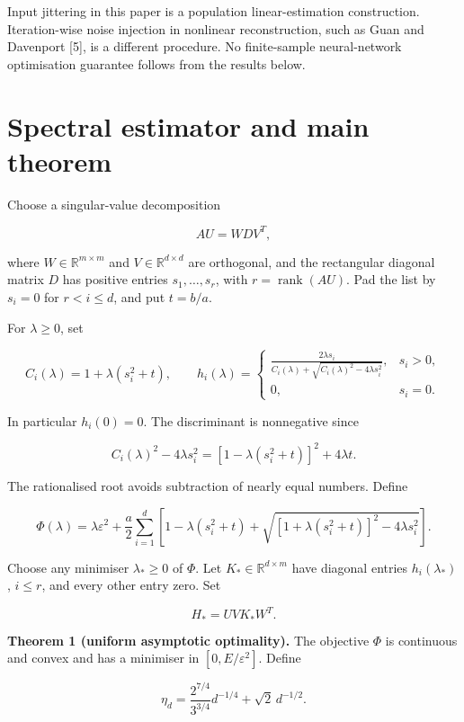 \documentclass[11pt,a4paper]{article}
\begin{document}
Input jittering in this paper is a population linear-estimation
construction. Iteration-wise noise injection in nonlinear
reconstruction, such as Guan and Davenport {[}5{]}, is a different
procedure. No finite-sample neural-network optimisation guarantee
follows from the results below.

\hypertarget{spectral-estimator-and-main-theorem}{%
\section{Spectral estimator and main
theorem}\label{spectral-estimator-and-main-theorem}}

Choose a singular-value decomposition

\[
AU=WDV^T,
\]

where \(W\in\mathbb R^{m\times m}\) and \(V\in\mathbb R^{d\times d}\)
are orthogonal, and the rectangular diagonal matrix \(D\) has positive
entries \(s_1,\ldots,s_r\), with \(r=\operatorname{rank}(AU)\). Pad the
list by \(s_i=0\) for \(r<i\le d\), and put \(t=b/a\).

For \(\lambda\ge0\), set

\[
C_i(\lambda)=1+\lambda(s_i^2+t),\qquad
h_i(\lambda)=
\begin{cases}
\displaystyle
\frac{2\lambda s_i}
{C_i(\lambda)+\sqrt{C_i(\lambda)^2-4\lambda s_i^2}},
&s_i>0,\\[8pt]
0,&s_i=0.
\end{cases}
\tag{3}
\]

In particular \(h_i(0)=0\). The discriminant is nonnegative since

\[
C_i(\lambda)^2-4\lambda s_i^2
=[1-\lambda(s_i^2+t)]^2+4\lambda t.
\]

The rationalised root avoids subtraction of nearly equal numbers. Define

\[
\Phi(\lambda)=\lambda\varepsilon^2+
\frac a2\sum_{i=1}^d
\left[
1-\lambda(s_i^2+t)
+\sqrt{[1+\lambda(s_i^2+t)]^2-4\lambda s_i^2}
\right].
\tag{4}
\]

Choose any minimiser \(\lambda_*\ge0\) of \(\Phi\). Let
\(K_*\in\mathbb R^{d\times m}\) have diagonal entries
\(h_i(\lambda_*)\), \(i\le r\), and every other entry zero. Set

\[
H_*=UVK_*W^T.
\tag{5}
\]

\textbf{Theorem 1 (uniform asymptotic optimality).} The objective
\(\Phi\) is continuous and convex and has a minimiser in
\([0,E/\varepsilon^2]\). Define

\[
\eta_d=\frac{2^{7/4}}{3^{3/4}}d^{-1/4}+\sqrt2\,d^{-1/2}.
\tag{6}
\]
\end{document}
